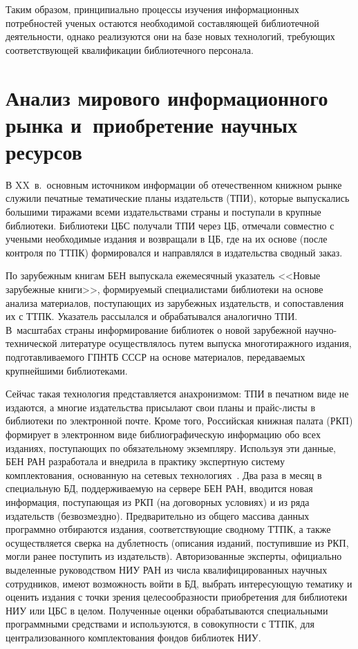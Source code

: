 \begin{multicols}{2}
   Таким образом, принципиально процессы изуче\-ния информационных потребностей 
ученых остаются необходимой составляющей библиотечной деятельности, однако 
реализуются они на базе новых технологий, требующих соответствующей квалификации 
библиотечного персонала. 
   
\section{Анализ мирового информационного рынка и~приобретение 
научных ресурсов}
   
   В XX~в.\ основным источником информации об отечественном книжном рынке 
служили печатные тематические планы издательств (ТПИ), которые выпускались большими 
тиражами всеми издательствами страны и поступали в крупные библиотеки. Библиотеки 
ЦБС получали ТПИ через ЦБ, отмечали совместно с учеными необходимые издания и 
возвращали в ЦБ, где на их основе (после контроля по ТТПК) формировался и 
направлялся в издательства сводный заказ. 
   
   По зарубежным книгам БЕН выпускала ежемесячный указатель <<Новые зарубежные 
книги>>, формируемый специалистами библиотеки на основе анализа материалов, 
поступающих из зарубежных издательств, и сопоставления их с ТТПК. Указатель 
рассылался и обрабатывался аналогично ТПИ. В~масштабах страны информирование 
библиотек о новой зарубежной на\-уч\-но-тех\-ни\-че\-ской литературе осуществлялось 
путем выпуска многотиражного издания, подготавливаемого ГПНТБ СССР на основе 
материалов, передаваемых крупнейшими библиотеками. 
   
   Сейчас такая технология представляется анахронизмом: ТПИ в печатном виде не 
издаются, а многие издательства присылают свои планы и прайс-лис\-ты в библиотеки по 
электронной почте. Кроме того, Российская книжная палата (РКП) формирует в 
электронном виде библиографическую информацию обо всех изданиях, по\-сту\-па\-ющих по 
обязательному экземпляру. Используя эти данные, БЕН РАН разработала и внедрила в 
практику экспертную систему комплектования, основанную на сетевых 
   технологиях~\cite{4kale, 5kale, 6kale}. Два раза в месяц в специальную БД, 
поддерживаемую на сервере БЕН РАН, вводится новая информация, поступающая из РКП 
(на договорных условиях) и из ряда издательств (безвозмездно). Предварительно из 
общего массива данных программно отбираются издания, соответствующие сводному 
ТТПК, а также осуществляется сверка на дублетность (описания изданий, поступившие из 
РКП, могли ранее поступить из издательств). Авторизованные эксперты, официально 
выделенные руководством НИУ РАН из числа квалифицированных научных сотрудников, 
имеют возможность войти в БД, выбрать интересующую тематику и оценить издания с 
точки зрения целесообразности приобретения для библиотеки НИУ или ЦБС в целом. 
Полученные оценки обрабатываются специальными про\-грам\-мны\-ми средствами и 
используются, в совокупности с ТТПК, для централизованного комплектования фондов 
биб\-лио\-тек НИУ. 
   

\end{multicols}
